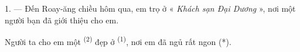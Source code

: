%
%
%
%
%


\VUsaut{3.0mm}
\VUsaut{1.6mm}
\VUsaut{2.0mm}
\VUsaut{3.4mm}

1. --- Đến Roay-ăng chiều hôm qua, em trọ ở « \textit{Khách sạn Đại Dương} », nơi một
người bạn đã giới thiệu cho em.

Người ta cho em một  \textsuperscript{(2)} đẹp ở 
\textsuperscript{(1)}, nơi em đã ngủ rất ngon (*).


